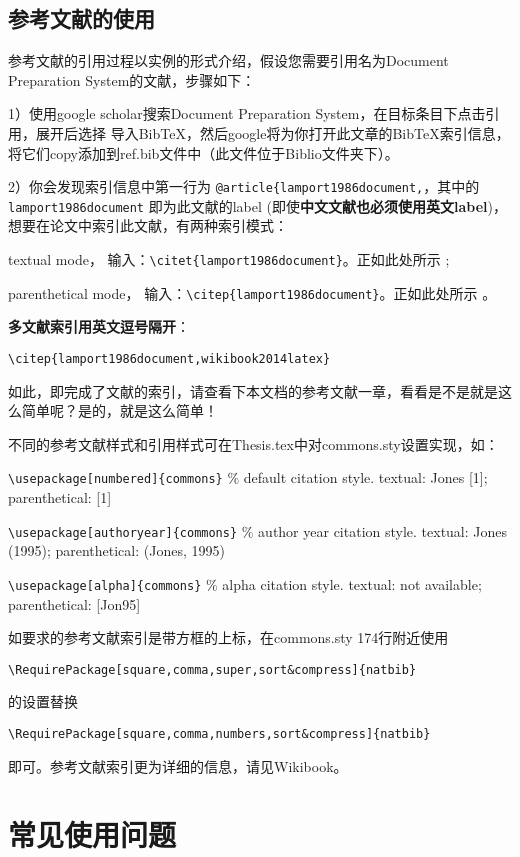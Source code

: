 \subsection{参考文献的使用}

参考文献的引用过程以实例的形式介绍，假设您需要引用名为Document Preparation System的文献，步骤如下：

1）使用google scholar搜索Document Preparation System，在目标条目下点击引用，展开后选择 导入BibTeX，然后google将为你打开此文章的BibTeX索引信息，将它们copy添加到ref.bib文件中（此文件位于Biblio文件夹下）。

2）你会发现索引信息中第一行为 \verb|@article{lamport1986document,|，其中的 \verb|lamport1986document| 即为此文献的label (即使\textbf{中文文献也必须使用英文label})，想要在论文中索引此文献，有两种索引模式：

textual mode， 输入：\verb|\citet{lamport1986document}|。正如此处所示 \citet{lamport1986document}; 

parenthetical mode， 输入：\verb|\citep{lamport1986document}|。正如此处所示 \citep{lamport1986document}。

\textbf{多文献索引用英文逗号隔开}：

\verb|\citep{lamport1986document,wikibook2014latex}|

如此，即完成了文献的索引，请查看下本文档的参考文献一章，看看是不是就是这么简单呢？是的，就是这么简单！

不同的参考文献样式和引用样式可在Thesis.tex中对commons.sty设置实现，如：

\verb+\usepackage[numbered]{commons}+ $\%$ default citation style. textual: Jones [1]; parenthetical: [1]

\verb+\usepackage[authoryear]{commons}+ $\%$ author year citation style. textual: Jones (1995); parenthetical: (Jones, 1995)

\verb+\usepackage[alpha]{commons}+ $\%$ alpha citation style. textual: not available; parenthetical: [Jon95]

如要求的参考文献索引是带方框的上标，在commons.sty 174行附近使用

\verb|\RequirePackage[square,comma,super,sort&compress]{natbib}|

的设置替换

\verb|\RequirePackage[square,comma,numbers,sort&compress]{natbib}|

即可。参考文献索引更为详细的信息，请见Wikibook\citep{wikibook2014latex}。

\section{常见使用问题}

